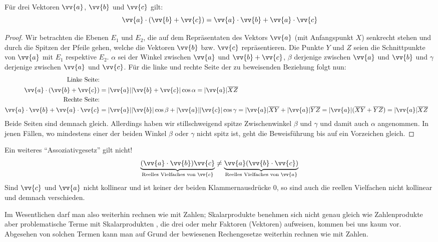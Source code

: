 \begin{theorem}[Distributivgesetz]
Für drei Vektoren $\vv{a}$, $\vv{b}$ und $\vv{c}$ gilt:
\[ \vv{a} \cdot (\vv{b} + \vv{c}) = \vv{a} \cdot \vv{b} + \vv{a} \cdot \vv{c} \]
\end{theorem}
\begin{proof}
Wir betrachten die Ebenen $E_{1}$ und $E_{2}$, die auf dem Repräsentaten des Vektors $\vv{a}$ (mit Anfangspunkt $X$) senkrecht stehen und durch die Spitzen der Pfeile gehen, welche die Vektoren $\vv{b}$ bzw. $\vv{c}$ repräsentieren. Die Punkte $Y$  und $Z$ seien die Schnittpunkte von $\vv{a}$ mit $E_{1}$ respektive $E_{2}$. $\alpha$ sei der Winkel zwischen $\vv{a}$ und $\vv{b} + \vv{c}$, $\beta$ derjenige zwischen $\vv{a}$ und $\vv{b}$ und $\gamma$ derjenige zwischen $\vv{a}$ und $\vv{c}$. Für die linke und rechte Seite der zu beweisenden Beziehung folgt nun:
\begin{align*}
\text{Linke Seite:}\\
\vv{a} \cdot (\vv{b} + \vv{c}) & =  |\vv{a}| |\vv{b} + \vv{c}| \cos{\alpha} = |\vv{a}| \overline{XZ}  \\
\text{Rechte Seite:}\\
\vv{a} \cdot \vv{b} + \vv{a} \cdot \vv{c} & = |\vv{a}| |\vv{b}| \cos{\beta} + |\vv{a}| |\vv{c}| \cos{\gamma} = |\vv{a}| \overline{XY} + |\vv{a}| \overline{YZ} = |\vv{a}| (\overline{XY} + \overline{YZ} ) = |\vv{a}| \overline{XZ}  
\end{align*}
Beide Seiten sind demnach gleich. Allerdings haben wir stillschweigend spitze Zwischenwinkel $\beta$ und  $\gamma$ und damit auch $\alpha$ angenommen. In jenen Fällen, wo mindestens einer der beiden Winkel $\beta$ oder $\gamma$ nicht spitz ist, geht die Beweisführung bis auf ein Vorzeichen gleich.
\end{proof}

\begin{warning}
Ein weiteres ``Assoziativgesetz'' gilt nicht!
\[ \underbrace{(\vv{a} \cdot \vv{b} ) \vv{c}}_{\text{Reelles Vielfaches von } \vv{c}} \neq \underbrace{\vv{a} (\vv{b} \cdot \vv{c} )}_{\text{Reelles Vielfaches von } \vv{a}} \]
Sind $\vv{c}$ und $\vv{a}$ nicht kollinear und ist keiner der beiden Klammernausdrücke 0, so sind auch die reellen Vielfachen nicht kollinear und demnach verschieden.
\end{warning}
Im Wesentlichen darf man also weiterhin rechnen wie mit Zahlen; Skalarprodukte benehmen sich nicht genau gleich wie Zahlenprodukte aber problematische Terme mit Skalarprodukten , die drei oder mehr Faktoren (Vektoren) aufweisen, kommen bei uns kaum vor. Abgesehen von solchen Termen kann man auf Grund der bewiesenen Rechengesetze weiterhin rechnen wie mit Zahlen.

